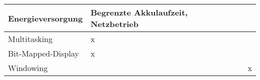 \documentclass[a4paper,ngerman]{scrreprt}
\begin{document}
\begin{table}[htb]
\begin{tabularx}{\linewidth}{%
|>{\raggedright\arraybackslash}X%
|>{\raggedright\arraybackslash}X%
|>{\raggedright\arraybackslash}X%
|>{\raggedright\arraybackslash}X%
|%
}
Energieversorgung      	& Begrenzte Akkulaufzeit, Netzbetrieb     		&                                   			&                            			\\ \hline
Multitasking           	& x                                       				&                                   			&                            			\\ \hline
Bit-Mapped-Display     	& x                                       				&                                   			&                            			\\ \hline
Windowing              	&                                         				&                                   			& x                          			\\ \hline
\end{tabularx}
\endgroup
\end{table}
\end{document}
